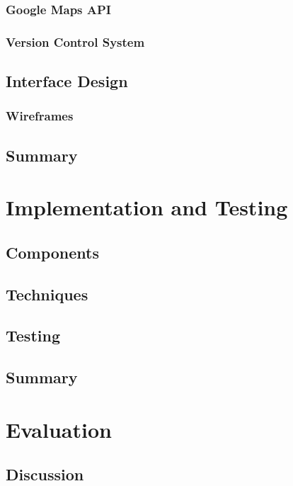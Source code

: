 \documentclass[authoryearcitations]{UoYCSproject}
\begin{document}
\subsection{Google Maps API}

\subsection{Version Control System}

\section{Interface Design}

\subsection{Wireframes}

\section{Summary}

\chapter{Implementation and Testing}

\section{Components}

\section{Techniques}

\section{Testing}

\section{Summary}

\chapter{Evaluation}

\section{Discussion}
\end{document}
